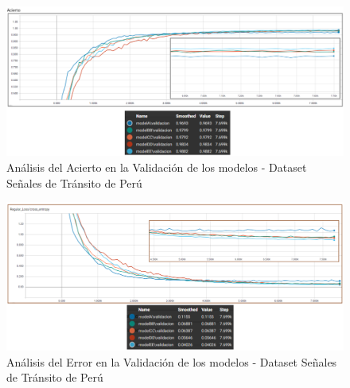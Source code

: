 			\begin{figure}[H]
				\includegraphics[width=1\textwidth, height=\textheight,keepaspectratio]{images/desarrollo/trainResults/peruSummary_validAcierto} 
				\begin{center}
				\caption{\small{Análisis del Acierto en la Validación de los modelos - Dataset Señales de Tránsito de Perú}}
				
				{\small{\fontsize{10}{16.8}\selectfont {Fuente: Elaboración propia}}}
				\end{center}
				\vspace{-1.5em}
			\end{figure}

			\begin{figure}[H]
				\includegraphics[width=1\textwidth, height=\textheight,keepaspectratio]{images/desarrollo/trainResults/peruSummary_validError} 
				\begin{center}
				\caption{\small{Análisis del Error en la Validación de los modelos - Dataset Señales de Tránsito de Perú}}
				
				{\small{\fontsize{10}{16.8}\selectfont {Fuente: Elaboración propia}}}
				\end{center}
				\vspace{-1.5em}
			\end{figure}